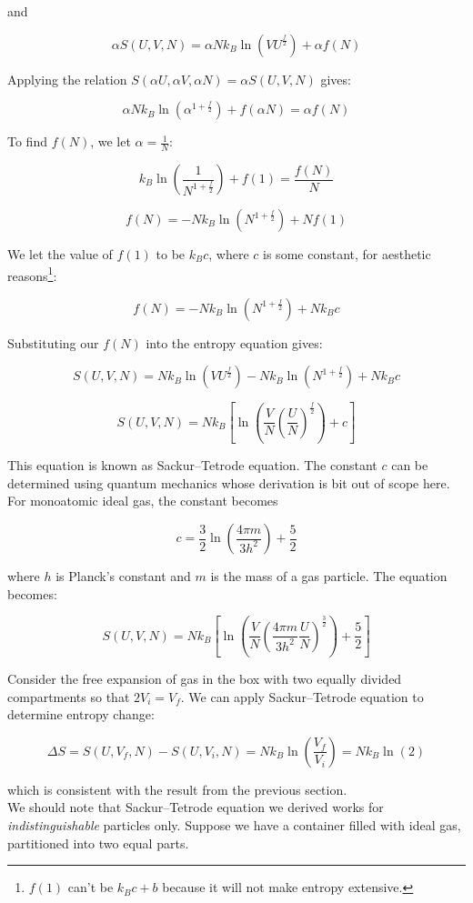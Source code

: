and

\[\alpha S(U,V,N)=\alpha Nk_B\ln\left(VU^\frac{f}{2}\right)+\alpha f(N)\]

Applying the relation $S(\alpha U,\alpha V,\alpha N)=\alpha S(U,V,N)$ gives:

\[\alpha Nk_B\ln\left(\alpha^{1+\frac{f}{2}}\right)+f(\alpha N)=\alpha f(N)\]

To find $f(N)$, we let $\alpha=\frac1N$:

\[k_B\ln\left(\frac{1}{N^{1+\frac{f}{2}}}\right)+f(1)=\frac{f(N)}{N}\]

\[f(N)=-Nk_B\ln\left(N^{1+\frac{f}{2}}\right)+Nf(1)\]

We let the value of $f(1)$ to be $k_Bc$, where $c$ is some constant, for aesthetic reasons\footnote{$f(1)$ can't be $k_Bc+b$ because it will not make entropy extensive.}:

\[f(N)=-Nk_B\ln\left(N^{1+\frac{f}{2}}\right)+Nk_Bc\]

Substituting our $f(N)$ into the entropy equation gives:

\[S(U,V,N)=Nk_B\ln\left(VU^\frac{f}{2}\right)-Nk_B\ln\left(N^{1+\frac{f}{2}}\right)+Nk_Bc\]

\[\boxed{S(U,V,N)=Nk_B\left[\ln\left(\frac{V}{N} \left(\frac{U}{N}\right)^\frac{f}{2}\right)+c\right]}\]

This equation is known as Sackur–Tetrode equation. The constant $c$ can be determined using quantum mechanics whose derivation is bit out of scope here. For monoatomic ideal gas, the constant becomes

\[c=\frac32 \ln\left( \frac{4\pi m}{3h^2} \right) + \frac52\]

where $h$ is Planck's constant and $m$ is the mass of a gas particle. The equation becomes:

\[\boxed{S(U,V,N)=Nk_B\left[\ln\left( \frac VN \left(\frac{4\pi m}{3h^2}\frac UN\right)^{\frac32}\right)+\frac52\right]}\]

Consider the free expansion of gas in the box with two equally divided compartments so that $2V_i=V_f$. We can apply Sackur–Tetrode equation to determine entropy change:

\[\Delta S=S(U,V_f,N)-S(U,V_i,N)=Nk_B\ln\left(\frac{V_f}{V_i}\right)=Nk_B\ln(2)\]

which is consistent with the result from the previous section. \\

We should note that Sackur–Tetrode equation we derived works for \textit{indistinguishable} particles only. Suppose we have a container filled with ideal gas, partitioned into two equal parts.

